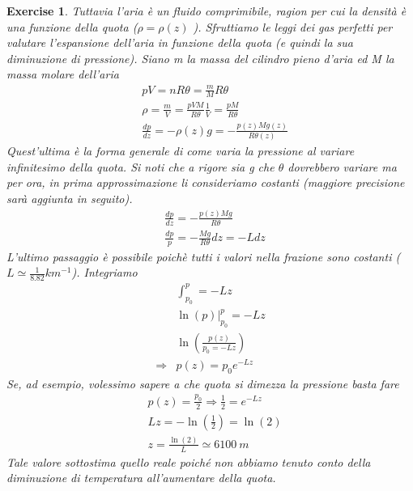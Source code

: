 \documentclass[10pt,a4paper]{article}
\newtheorem{exercise}{Exercise}
\begin{document}
\begin{exercise}
Tuttavia l'aria è un fluido comprimibile, ragion per cui la densità è una funzione della quota ($\rho = \rho(z)$ ). Sfruttiamo le leggi dei gas perfetti per valutare l'espansione dell'aria in funzione della quota (e quindi la sua diminuzione di pressione). Siano m la massa del cilindro pieno d'aria ed M la massa molare dell'aria
\begin{align*} 
	&p V = n R \theta = \frac{m}{M} R \theta \\
	&\rho = \frac{m}{V} = \frac{p V M}{R \theta} \frac{1}{V} = \frac{p M}{R \theta}\\
	&\frac{dp}{dz}=-\rho(z) g = - \frac{p(z) M g(z)}{R\theta(z)}
\end{align*} 
Quest'ultima è la forma generale di come varia la pressione al variare infinitesimo della quota. Si noti che a rigore sia g che $\theta$ dovrebbero variare ma per ora, in prima approssimazione li consideriamo costanti (maggiore precisione sarà aggiunta in seguito). 
\begin{align*} 
	&\frac{dp}{dz}=- \frac{p(z) M g}{R\theta}\\
	&\frac{dp}{p} = -\frac{M g}{R \theta} dz = - L dz
\end{align*} 
L'ultimo passaggio è possibile poichè tutti i valori nella frazione sono costanti ($ L \simeq \frac{1}{8.82} km^{-1}$). Integriamo
\begin{align*} 
	&\int_{p_0}^{p} = -L z\\
	& \ln(p) \Big|_{p_0}^p = -L z\\
	&\ln\left(\frac{p(z)}{p_0= - L z}\right)\\
	\Rightarrow& p(z) = p_0 e^{-L z}
\end{align*} 
Se, ad esempio, volessimo sapere a che quota si dimezza la pressione basta fare
\begin{align*} 
	&p(z) = \frac{p_0}{2} \Rightarrow \frac{1}{2} = e^{-L z}\\
	&L z = -\ln(\frac{1}{2}) = \ln(2) \\
	&z = \frac{\ln(2)}{L} \simeq 6100\ m
\end{align*} 
Tale valore sottostima quello reale poiché non abbiamo tenuto conto della diminuzione di temperatura all'aumentare della quota.
\end{exercise}
\end{document}
